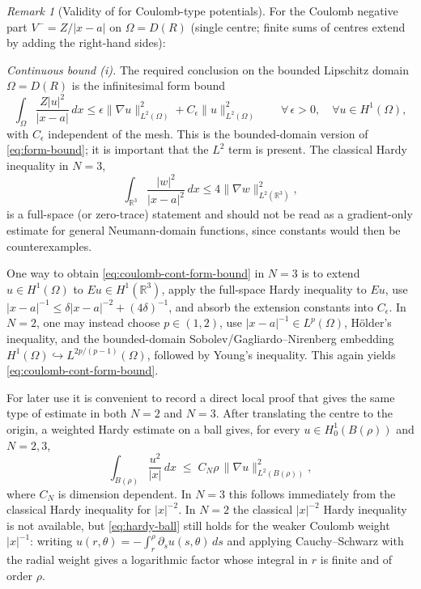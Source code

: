 \documentclass[11pt]{article}
\theoremstyle{plain}
\theoremstyle{definition}
\theoremstyle{remark}
\newtheorem{remark}{Remark}
\begin{document}
\begin{remark}[Validity of  for Coulomb-type potentials]
\label{rmk:kato-ch-valid}
For the Coulomb negative part $V^-=Z/|x-a|$ on $\Omega=D(R)$ (single
centre; finite sums of centres extend by adding the right-hand sides):

\smallskip
\noindent\emph{Continuous bound (i).}
The required conclusion on the bounded Lipschitz domain
$\Omega=D(R)$ is the infinitesimal form bound
\begin{equation}
\label{eq:coulomb-cont-form-bound}
  \int_\Omega \frac{Z|u|^2}{|x-a|}\,dx
  \le
  \epsilon\|\nabla u\|_{L^2(\Omega)}^2
  + C_\epsilon\|u\|_{L^2(\Omega)}^2
  \qquad \forall\,\epsilon>0,\quad \forall u\in H^1(\Omega),
\end{equation}
with $C_\epsilon$ independent of the mesh.  This is the bounded-domain
version of \eqref{eq:form-bound}; it is important that the $L^2$
term is present.  The classical Hardy inequality in $N=3$,
\[
  \int_{\mathbb R^3}\frac{|w|^2}{|x-a|^2}\,dx
  \le 4\|\nabla w\|_{L^2(\mathbb R^3)}^2,
\]
is a full-space (or zero-trace) statement and should not be read as a
gradient-only estimate for general Neumann-domain functions, since
constants would then be counterexamples.

One way to obtain \eqref{eq:coulomb-cont-form-bound} in $N=3$ is to
extend $u\in H^1(\Omega)$ to $Eu\in H^1(\mathbb R^3)$, apply the
full-space Hardy inequality to $Eu$, use
$|x-a|^{-1}\le\delta |x-a|^{-2}+(4\delta)^{-1}$, and absorb the
extension constants into $C_\epsilon$. In $N=2$, one may instead
choose $p\in(1,2)$, use $|x-a|^{-1}\in L^p(\Omega)$, H\"older's
inequality, and the bounded-domain Sobolev/Gagliardo--Nirenberg
embedding $H^1(\Omega)\hookrightarrow L^{2p/(p-1)}(\Omega)$, followed
by Young's inequality. This again yields \eqref{eq:coulomb-cont-form-bound}.

For later use it is convenient to record a direct local proof that gives
the same type of estimate in both $N=2$ and $N=3$.  After translating the
centre to the origin, a weighted Hardy estimate on a ball gives, for
every $u\in H^1_0(B(\rho))$ and $N=2,3$,
\begin{equation}
\label{eq:hardy-ball}
  \int_{B(\rho)}\frac{u^2}{|x|}\,dx
  \;\le\; C_N\rho\,\|\nabla u\|_{L^2(B(\rho))}^2,
\end{equation}
where $C_N$ is dimension dependent.  In $N=3$ this follows
immediately from the classical Hardy inequality for
$|x|^{-2}$. In $N=2$ the classical $|x|^{-2}$ Hardy inequality
is not available, but \eqref{eq:hardy-ball} still holds for the
weaker Coulomb weight $|x|^{-1}$: writing
$u(r,\theta)=-\int_r^\rho\partial_su(s,\theta)\,ds$ and applying
Cauchy--Schwarz with the radial weight gives a logarithmic factor
whose integral in $r$ is finite and of order $\rho$.


\end{remark}
\end{document}
